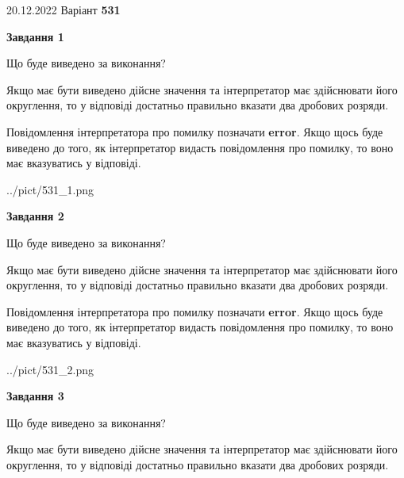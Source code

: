 \documentclass[12pt, ukrainian]{article}
\begin{document}
{20.12.2022 Варіант \No \textbf { 531 }\par}
{
\begin {Large}

{\begin {center}\textbf{Завдання 1}\end {center}}\par
Що буде виведено за виконання? \par

Якщо має бути виведено дійсне значення та інтерпретатор має здійснювати його округлення, 
то у відповіді достатньо правильно вказати два дробових розряди.

Повідомлення інтерпретатора про помилку позначати \textbf{error}.
Якщо щось буде виведено до того, як інтерпретатор видасть повідомлення про помилку, 
то воно має вказуватись у відповіді. \par

\begin{center}
	{../pict/531_1.png}
\end{center}
\newpage

{\begin {center}\textbf{Завдання 2}\end {center}}\par
Що буде виведено за виконання? \par

Якщо має бути виведено дійсне значення та інтерпретатор має здійснювати його округлення, 
то у відповіді достатньо правильно вказати два дробових розряди.

Повідомлення інтерпретатора про помилку позначати \textbf{error}.
Якщо щось буде виведено до того, як інтерпретатор видасть повідомлення про помилку, 
то воно має вказуватись у відповіді. \par

\begin{center}
	{../pict/531_2.png}
\end{center}
\newpage

{\begin {center}\textbf{Завдання 3}\end {center}}\par
Що буде виведено за виконання? \par

Якщо має бути виведено дійсне значення та інтерпретатор має здійснювати його округлення, 
то у відповіді достатньо правильно вказати два дробових розряди.


\end{Large}}
\end{document}
